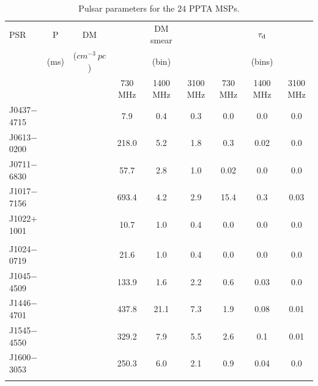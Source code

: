 \documentclass[useAMS,usenatbib]{mn2e}
\begin{document}
\begin{table}
\caption{Pulsar parameters for the $24$ PPTA MSPs.}
\label{psr}
\begin{center}
\begin{tabular}{lcccccccc}
\hline
PSR         &   P     &       DM          &          &  DM smear &             &          &   $\tau_{\rm{d}}$ &           \\
            &  (ms)   &  ($cm^{-3}\ pc$)  &          &   (bin)   &             &          &     (bins)        &           \\
			      &         &                   &  730 MHz & 1400 MHz  & 3100 MHz    & 730 MHz  &     1400 MHz      & 3100 MHz  \\
\hline
J0437$-$4715&         &                   & 7.9      & 0.4       & 0.3         &  0.0     &  0.0              &  0.0     \\
J0613$-$0200&         &                   & 218.0    & 5.2       & 1.8         &  0.3     &  0.02             &  0.0      \\
J0711$-$6830&         &                   & 57.7     & 2.8       & 1.0         &  0.02    &  0.0              &  0.0     \\
J1017$-$7156&         &                   & 693.4    & 4.2       & 2.9         &  15.4    &  0.3              &  0.03    \\
J1022$+$1001&         &                   & 10.7     & 1.0       & 0.4         &  0.0     &  0.0              &  0.0      \\
            &         &                   &          &           &             &          &                   &           \\
J1024$-$0719&         &                   & 21.6     & 1.0       & 0.4         &  0.0     &  0.0              &  0.0      \\
J1045$-$4509&         &                   & 133.9    & 1.6       & 2.2         &  0.6     &  0.03             &  0.0      \\ 
J1446$-$4701&         &                   & 437.8    & 21.1      & 7.3         &  1.9     &  0.08             &  0.01     \\ 
J1545$-$4550&         &                   & 329.2    & 7.9       & 5.5         &  2.6     &  0.1              &  0.01      \\ 
J1600$-$3053&         &                   & 250.3    & 6.0       & 2.1         &  0.9     &  0.04             &  0.0      \\ 
            &         &                   &          &           &             &          &                   &           \\

\end{tabular}
\end{center}
\end{table}
\end{document}
